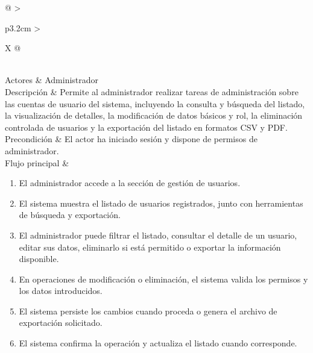 \begin{table}[]
	\label{tab:cu12}
	\centering
	\footnotesize
	\renewcommand{\arraystretch}{1.3}
	\setlength{\tabcolsep}{4pt}
	\begin{tabularx}{\textwidth}{@{}
			>{\raggedright\arraybackslash}p{3.2cm}
			>{\raggedright\arraybackslash}X
			@{}}
		\toprule
		 \\
		\midrule
		Actores &
		Administrador \\
		
		Descripción &
		Permite al administrador realizar tareas de administración sobre las cuentas de usuario del sistema, incluyendo la consulta y búsqueda del listado, la visualización de detalles, la modificación de datos básicos y rol, la eliminación controlada de usuarios y la exportación del listado en formatos CSV y PDF. \\
		
		Precondición &
		El actor ha iniciado sesión y dispone de permisos de administrador. \\
		
		Flujo principal &
		\begin{minipage}[t]{\linewidth}
			\vspace{-\baselineskip}
			\begin{enumerate}
				\renewcommand{\labelenumi}{\arabic{enumi})}
				\setlength{\itemsep}{0pt}
				\setlength{\parskip}{0pt}
				\setlength{\parsep}{0pt}
				\item El administrador accede a la sección de gestión de usuarios.
				\item El sistema muestra el listado de usuarios registrados, junto con herramientas de búsqueda y exportación.
				\item El administrador puede filtrar el listado, consultar el detalle de un usuario, editar sus datos, eliminarlo si está permitido o exportar la información disponible.
				\item En operaciones de modificación o eliminación, el sistema valida los permisos y los datos introducidos.
				\item El sistema persiste los cambios cuando proceda o genera el archivo de exportación solicitado.
				\item El sistema confirma la operación y actualiza el listado cuando corresponde.
			\end{enumerate}
		\end{minipage} \\
		

\end{tabularx}
\end{table}
